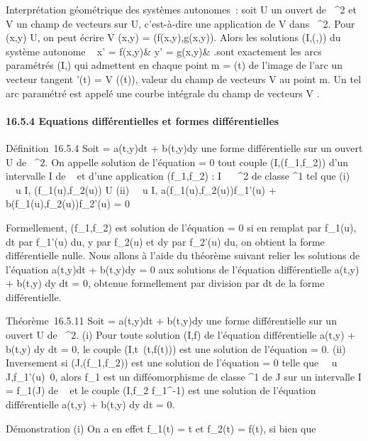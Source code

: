 \documentclass[]{article}
\begin{document}
Interprétation géométrique des systèmes autonomes~: soit U un ouvert de
~^2 et V un champ de vecteurs sur U, c'est-à-dire une
application de V dans ~^2. Pour (x,y) \in U, on peut écrire V
(x,y) = (f(x,y),g(x,y)). Alors les solutions (I,(\phi,\psi)) du système
autonome \left \ \cases
x' = f(x,y)& \cr y' = g(x,y)&  \right
.sont exactement les arcs paramétrés (I,\Phi) qui admettent en chaque point
m = \Phi(t) de l'image de l'arc un vecteur tangent \Phi'(t) = V (\Phi(t)), valeur
du champ de vecteurs V au point m. Un tel arc paramétré est appelé une
courbe intégrale du champ de vecteurs V .

\paragraph{16.5.4 Equations différentielles et formes différentielles}

Définition~16.5.4 Soit \omega = a(t,y)dt + b(t,y)dy une forme différentielle
sur un ouvert U de ~^2. On appelle solution de l'équation \omega =
0 tout couple (I,(f\_1,f\_2)) d'un intervalle I de ~ et
d'une application (f\_1,f\_2) : I \rightarrow~ ~^2 de
classe ^1 tel que (i) \forall~~u \in I,
(f\_1(u),f\_2(u)) \in U (ii) \forall~~u
\in I, a(f\_1(u),f\_2(u))f\_1'(u) +
b(f\_1(u),f\_2(u))f\_2'(u) = 0

Formellement, (f\_1,f\_2) est solution de l'équation \omega =
0 si en rempla\ccant t par f\_1(u), dt par
f\_1'(u) du, y par f\_2(u) et dy par f\_2'(u)
du, on obtient la forme différentielle nulle. Nous allons à l'aide du
théorème suivant relier les solutions de l'équation a(t,y)dt + b(t,y)dy
= 0 aux solutions de l'équation différentielle a(t,y) + b(t,y) dy
\over dt = 0, obtenue formellement par division par dt
de la forme différentielle.

Théorème~16.5.11 Soit \omega = a(t,y)dt + b(t,y)dy une forme différentielle
sur un ouvert U de ~^2. (i) Pour toute solution (I,f) de
l'équation différentielle a(t,y) + b(t,y) dy \over dt
= 0, le couple (I,t\mapsto~(t,f(t))) est une
solution de l'équation \omega = 0. (ii) Inversement si
(J,(f\_1,f\_2)) est une solution de l'équation \omega = 0
telle que \forall~~u \in
J,f\_1'(u)\neq~0, alors f\_1 est
un difféomorphisme de classe ^1 de J sur un intervalle I =
f\_1(J) de ~ et le couple (I,f\_2 \cdot
f\_1^-1) est une solution de l'équation différentielle
a(t,y) + b(t,y) dy \over dt = 0.

Démonstration (i) On a en effet f\_1(t) = t et f\_2(t) =
f(t), si bien que
\end{document}
